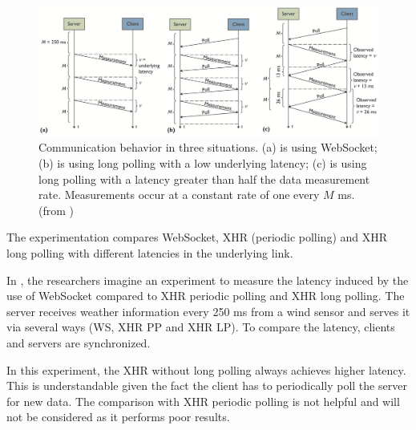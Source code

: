 \documentclass[10pt,journal,compsoc]{IEEEtran}
\newcommand{\ws}{WebSocket}
\begin{document}
\begin{figure}[!t]
    \centering
    \includegraphics[width=\textwidth]{comdisp.png}
    \caption{Communication behavior in three situations. (a) is using \ws{}; (b) is using long polling with a low underlying latency; (c) is using long polling with a latency greater than half the data measurement rate. Measurements occur at a constant rate of one every $M$ ms. (from \cite{communicationAndDIsplayingRealTimeDataWithWebSocket})}
    \label{fig:comdisp}
\end{figure}

The experimentation compares \ws{}, XHR (periodic polling) and XHR long polling with different latencies in the underlying link.

In \cite{communicationAndDIsplayingRealTimeDataWithWebSocket}, the researchers imagine an experiment to measure the latency induced by the use of \ws{} compared to XHR periodic polling and XHR long polling.
The server receives weather information every 250 ms from a wind sensor and serves it via several ways (WS, XHR PP and XHR LP).
To compare the latency, clients and servers are synchronized.

In this experiment, the XHR without long polling always achieves higher latency.
This is understandable given the fact the client has to periodically poll the server for new data.
The comparison with XHR periodic polling is not helpful and will not be considered as it performs poor results.
\end{document}
